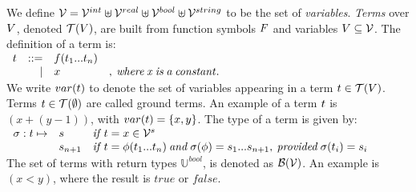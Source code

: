 We define $\mathcal{V} = \mathcal{V}^{int} \uplus \mathcal{V}^{real} \uplus \mathcal{V}^{bool} \uplus \mathcal{V}^{string}$ to be the set of \textit{variables}. \textit{Terms} over $V$, denoted $\mathcal{T}(V)$, are built from function symbols $F$ and variables $V \subseteq \mathcal{V}$. The definition of a term is:
\vspace{8px}\\
$\begin{array}{lrlr}t & ::= & f(t_1 ... t_n) &\\ & | & x&\mathit{,\: where\: x\: is\: a\: constant.}\end{array}$
\vspace{8px}\\
We write $var(t)$ to denote the set of variables appearing in a term $t \in \mathcal{T}(V)$. Terms $t\in \mathcal{T}(\emptyset)$ are called ground terms. An example of a term $t$ is $(x+(y-1))$, with $var(t) = \{x,y\}$. The type of a term is given by:
\vspace{8px}\\
$\begin{array}{lll}\sigma: t \mapsto & s       & \mathit{if}\: t = x \in \mathcal{V}^s \\ 
 & s_{n+1} & \mathit{if}\: t = \phi(t_1 ... t_n) \mathit{\:and\:} \sigma(\phi) = s_1 ... s_{n+1}\mathit{,\:provided\:} \sigma(t_i) = s_i
\end{array}$
\vspace{8px}\\
The set of terms with return types $\mathbb{U}^{bool}$, is denoted as $\mathcal{B}(\mathcal{V})$. An example is $(x < y)$, where the result is $\mathit{true}$ or $\mathit{false}$.

